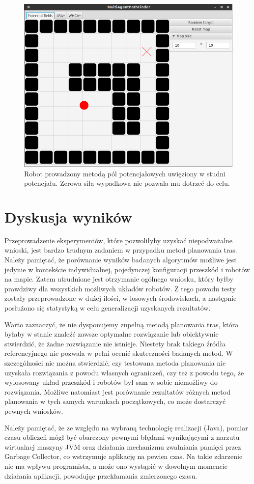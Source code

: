 \begin{figure}[H]
	\centering
	\includegraphics[width=0.6\columnwidth]{img/robopath/field-potential-hole}
	\caption{Robot prowadzony metodą pól potencjałowych uwięziony w studni potencjału. Zerowa siła wypadkowa nie pozwala mu dotrzeć do celu.}
	\label{fig:test-field-potential-hole}
\end{figure}

\section{Dyskusja wyników}
Przeprowadzenie eksperymentów, które pozwoliłyby uzyskać niepodważalne wnioski, jest bardzo trudnym zadaniem w przypadku metod planowania tras.
Należy pamiętać, że porównanie wyników badanych algorytmów możliwe jest jedynie w kontekście indywidualnej, pojedynczej konfiguracji przeszkód i robotów na mapie.
Zatem utrudnione jest otrzymanie ogólnego wniosku, który byłby prawdziwy dla wszystkich możliwych układów robotów.
Z tego powodu testy zostały przeprowadzone w dużej ilości, w losowych środowiskach, a następnie posłużono się statystyką w celu generalizacji uzyskanych rezultatów.

Warto zaznaczyć, że nie dysponujemy zupełną metodą planowania tras, która byłaby w stanie znaleźć zawsze optymalne rozwiązanie lub obiektywnie stwierdzić, że żadne rozwiązanie nie istnieje.
Niestety brak takiego źródła referencyjnego nie pozwala w pełni ocenić skuteczności badanych metod. W szczególności nie można stwierdzić, czy testowana metoda planowania nie uzyskała rozwiązania z powodu własnych ograniczeń, czy też z powodu tego, że wylosowany układ przeszkód i robotów był sam w sobie niemożliwy do rozwiązania.
Możliwe natomiast jest porównanie rezultatów różnych metod planowania w tych samych warunkach początkowych, co może dostarczyć pewnych wniosków.

Należy pamiętać, że ze względu na wybraną technologię realizacji (Java), pomiar czasu obliczeń mógł być obarczony pewnymi błędami wynikającymi z narzutu wirtualnej maszyny JVM oraz działania mechanizmu zwalniania pamięci przez Garbage Collector, co wstrzymuje aplikację na pewien czas.
Na takie zdarzenie nie ma wpływu programista, a może ono wystąpić w dowolnym momencie działania aplikacji, powodując przekłamania zmierzonego czasu.

